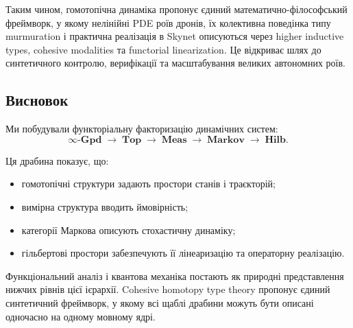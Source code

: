 \documentclass[a4paper,12pt]{article}
\begin{document}
Таким чином, гомотопічна динаміка пропонує єдиний математично-філософський фреймворк, у якому нелінійні PDE роїв дронів, їх колективна поведінка типу murmuration і практична реалізація в Skynet описуються через higher inductive types, cohesive modalities та functorial linearization. Це відкриває шлях до синтетичного контролю, верифікації та масштабування великих автономних роїв.


\newpage
\subsection*{Висновок}

Ми побудували функторіальну факторизацію динамічних систем:
\[
\infty\text{-}\mathbf{Gpd} \;\to\; \mathbf{Top} \;\to\; \mathbf{Meas} \;\to\; \mathbf{Markov} \;\to\; \mathbf{Hilb}.
\]

Ця драбина показує, що:
\begin{itemize}
    \item гомотопічні структури задають простори станів і траєкторій;
    \item вимірна структура вводить ймовірність;
    \item категорії Маркова описують стохастичну динаміку;
    \item гільбертові простори забезпечують її лінеаризацію та операторну реалізацію.
\end{itemize}

Функціональний аналіз і квантова механіка постають як природні представлення нижчих рівнів цієї ієрархії.
Cohesive homotopy type theory пропонує єдиний синтетичний фреймворк, у якому всі щаблі драбини можуть
бути описані одночасно на одному мовному ядрі.
\end{document}
